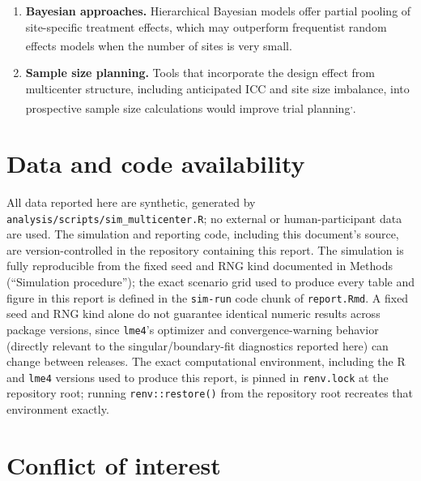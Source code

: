 \documentclass[
  11pt,
]{article}
\begin{document}
\begin{enumerate}
  should be substituted and evaluated across the same
  scenario grid, particularly for the \(K = 10\), high-
  site-variance conditions where few sites most threaten
  the adequacy of any df approximation.
\item
  \textbf{Bayesian approaches.} Hierarchical Bayesian models
  offer partial pooling of site-specific treatment
  effects, which may outperform frequentist random
  effects models when the number of sites is very small\textsuperscript{}.
\item
  \textbf{Sample size planning.} Tools that incorporate the
  design effect from multicenter structure, including
  anticipated ICC and site size imbalance, into
  prospective sample size calculations would improve
  trial planning\textsuperscript{,}.
\end{enumerate}

\section{Data and code availability}\label{data-and-code-availability}

All data reported here are synthetic, generated by
\texttt{analysis/scripts/sim\_multicenter.R}; no external or human-participant
data are used. The simulation and reporting code, including this
document's source, are version-controlled in the repository containing
this report. The simulation is fully reproducible from the fixed seed
and RNG kind documented in Methods (``Simulation procedure''); the exact
scenario grid used to produce every table and figure in this report is
defined in the \texttt{sim-run} code chunk of \texttt{report.Rmd}. A fixed seed and
RNG kind alone do not guarantee identical numeric results across
package versions, since \texttt{lme4}'s optimizer and convergence-warning
behavior (directly relevant to the singular/boundary-fit diagnostics
reported here) can change between releases. The exact computational
environment, including the R and \texttt{lme4} versions used to produce this
report, is pinned in \texttt{renv.lock} at the repository root; running
\texttt{renv::restore()} from the repository root recreates that environment
exactly.

\section{Conflict of interest}\label{conflict-of-interest}
\end{document}
